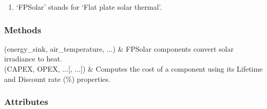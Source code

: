 \documentclass[letterpaper,10pt,english]{sphinxmanual}
\begin{document}
\begin{fulllineitems}
\begin{fulllineitems}
\begin{enumerate}
\item {} 
\sphinxAtStartPar
‘FPSolar’ stands for ‘Flat plate solar thermal’.

\end{enumerate}

\end{fulllineitems}

\subsubsection*{Methods}


\begin{savenotes}\sphinxattablestart
\centering
\begin{tabulary}{\linewidth}[t]{}
\hline

\sphinxAtStartPar
{\hyperref[\detokenize{generated/tamos.production.FPSolar:tamos.production.FPSolar.__init__}]{}}(energy\_sink, air\_temperature, ...)
&
\sphinxAtStartPar
FPSolar components convert solar irradiance to heat.
\\
\hline
\sphinxAtStartPar
{\hyperref[\detokenize{generated/tamos.production.FPSolar:tamos.production.FPSolar.compute_actualized_cost}]{}}(CAPEX, OPEX, ...{[}, ...{]})
&
\sphinxAtStartPar
Computes the cost of a component using its \textquotesingle{}Lifetime\textquotesingle{} and \textquotesingle{}Discount rate (\%)\textquotesingle{} properties.
\\
\hline
\end{tabulary}
\par
\sphinxattableend\end{savenotes}
\subsubsection*{Attributes}


\begin{savenotes}\sphinxattablestart
\centering
\begin{tabulary}{\linewidth}[t]{}
\hline


\end{tabulary}
\end{savenotes}
\end{fulllineitems}
\end{document}

